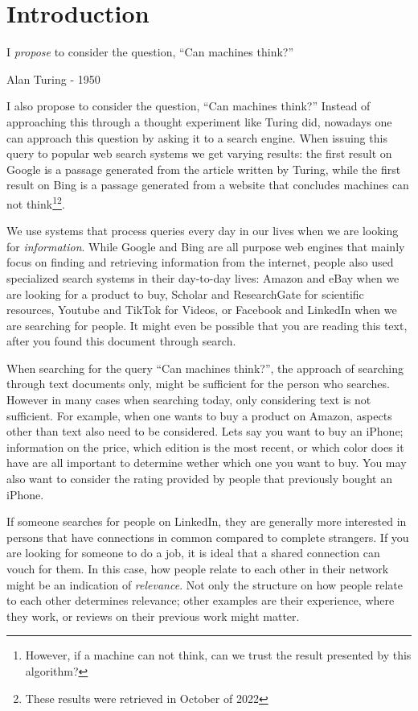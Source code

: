 \chapter{Introduction}
\epigraph{I \textit{propose} to consider the question, ``Can machines think?''}{Alan Turing - 1950}

I also propose to consider the question, ``Can machines think?'' Instead of approaching this through a thought experiment like Turing did, nowadays one can approach this question by asking it to a search engine. When issuing this query to popular web search systems we get varying results: the first result on Google is a passage generated from the article written by Turing, while the first result on Bing is a passage generated from a website that concludes machines can not think\footnote{However, if a machine can not think, can we trust the result presented by this algorithm?}\footnote{These results were retrieved in October of 2022}.

We use systems that process queries every day in our lives when we are looking for \textit{information}. While Google and Bing are all purpose web engines that mainly focus on finding and retrieving information from the internet, people also used specialized search systems in their day-to-day lives: Amazon and eBay when we are looking for a product to buy, Scholar and ResearchGate for scientific resources, Youtube and TikTok for Videos, or Facebook and LinkedIn when we are searching for people. It might even be possible that you are reading this text, after you found this document through search. 

When searching for the query ``Can machines think?'', the approach of searching through text documents only, might be sufficient for the person who searches. However in many cases when searching today, only considering text is not sufficient. For example, when one wants to buy a product on Amazon, aspects other than text also need to be considered. Lets say you want to buy an iPhone; information on the price, which edition is the most recent, or which color does it have are all important to determine wether which one you want to buy. You may also want to consider the rating provided by people that previously bought an iPhone.

If someone searches for people on LinkedIn, they are generally more interested in persons that have connections in common compared to complete strangers. If you are looking for someone to do a job, it is ideal that a shared connection can vouch for them. In this case, how people relate to each other in their network might be an indication of \textit{relevance}. Not only the structure on how people relate to each other determines relevance; other examples are their experience, where they work, or reviews on their previous work might matter.

